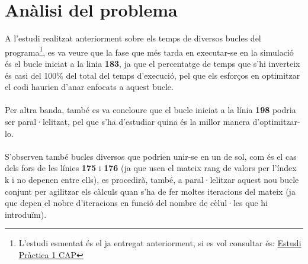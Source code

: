 \documentclass[a4paper, 11pt]{article}
\begin{document}
\section{Anàlisi del problema}
A l'estudi realitzat anteriorment sobre els temps de diversos bucles del programa\footnote{L'estudi esmentat és el ja entregat anteriorment, si es vol consultar és: \textcolor{blue}{\href{https://drive.google.com/file/d/1cSu44VuoF-0nm9SR1Bhz5VClLV0hwk4E/view?usp=sharing}{Estudi Pràctica 1 CAP}}}, es va veure que la fase que més tarda en executar-se en la simulació és el bucle iniciat a la linia \textbf{183}, ja que el percentatge de temps que s'hi inverteix és casi del 100\% del total del temps d'execució, pel que els esforços en optimitzar el codi haurien d'anar enfocats a aquest bucle.\\\\
Per altra banda, també es va concloure que el bucle iniciat a la línia \textbf{198} podria ser paral·lelitzat, pel que s'ha d'estudiar quina és la millor manera d'optimitzar-lo.\\\\
S'observen també bucles diversos que podrien unir-se en un de sol, com és el cas dels fors de les línies \textbf{175} i \textbf{176} (ja que usen el mateix rang de valors per l'índex k i no depenen entre ells), es procedirà, també, a paral·lelitzar aquest nou bucle conjunt per agilitzar els càlculs quan s'ha de fer moltes iteracions del mateix (ja que depen el nobre d'iteracions en funció del nombre de cèlul·les que hi introduïm).\\
\newpage
\end{document}
